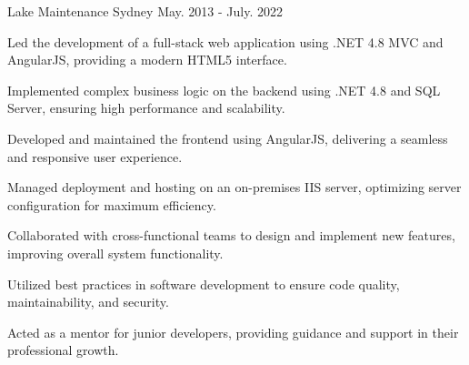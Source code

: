 \begin{cventries}
  {Lake Maintenance} %
  {Sydney} %
  {May. 2013 - July. 2022} %
  { \begin{cvitems} %
      \item {Led the development of a full-stack web application using .NET 4.8 MVC and AngularJS, providing a modern HTML5 interface.}
      \item {Implemented complex business logic on the backend using .NET 4.8 and SQL Server, ensuring high performance and scalability.}
      \item {Developed and maintained the frontend using AngularJS, delivering a seamless and responsive user experience.}
      \item {Managed deployment and hosting on an on-premises IIS server, optimizing server configuration for maximum efficiency.}
      \item {Collaborated with cross-functional teams to design and implement new features, improving overall system functionality.}
      \item {Utilized best practices in software development to ensure code quality, maintainability, and security.}
      \item {Acted as a mentor for junior developers, providing guidance and support in their professional growth.}
    \end{cvitems} }


\end{cventries}

